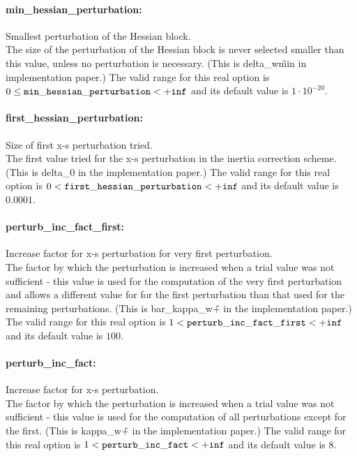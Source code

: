 \paragraph{min\_hessian\_perturbation:} Smallest perturbation of the Hessian block. $\;$ \\
 The size of the perturbation of the Hessian block
is never selected smaller than this value, unless
no perturbation is necessary. (This is
delta\_w\^min in implementation paper.) The valid range for this real option is 
$0 \le {\tt min\_hessian\_perturbation } <  {\tt +inf}$
and its default value is $1 \cdot 10^{-20}$.


\paragraph{first\_hessian\_perturbation:} Size of first x-s perturbation tried. $\;$ \\
 The first value tried for the x-s perturbation in
the inertia correction scheme.(This is delta\_0
in the implementation paper.) The valid range for this real option is 
$0 <  {\tt first\_hessian\_perturbation } <  {\tt +inf}$
and its default value is $0.0001$.


\paragraph{perturb\_inc\_fact\_first:} Increase factor for x-s perturbation for very first perturbation. $\;$ \\
 The factor by which the perturbation is increased
when a trial value was not sufficient - this
value is used for the computation of the very
first perturbation and allows a different value
for for the first perturbation than that used for
the remaining perturbations. (This is
bar\_kappa\_w\^+ in the implementation paper.) The valid range for this real option is 
$1 <  {\tt perturb\_inc\_fact\_first } <  {\tt +inf}$
and its default value is $100$.


\paragraph{perturb\_inc\_fact:} Increase factor for x-s perturbation. $\;$ \\
 The factor by which the perturbation is increased
when a trial value was not sufficient - this
value is used for the computation of all
perturbations except for the first. (This is
kappa\_w\^+ in the implementation paper.) The valid range for this real option is 
$1 <  {\tt perturb\_inc\_fact } <  {\tt +inf}$
and its default value is $8$.


